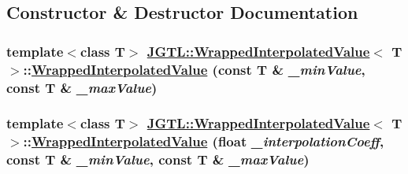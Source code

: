 \subsection{Constructor \& Destructor Documentation}
\hypertarget{class_j_g_t_l_1_1_wrapped_interpolated_value_ee757c96b36d3c8f65accff6005e5c11}{
\subsubsection[WrappedInterpolatedValue]{\setlength{\rightskip}{0pt plus 5cm}template$<$class T$>$ \hyperlink{class_j_g_t_l_1_1_wrapped_interpolated_value}{JGTL::Wrapped\-Interpolated\-Value}$<$ T $>$::\hyperlink{class_j_g_t_l_1_1_wrapped_interpolated_value}{Wrapped\-Interpolated\-Value} (const T \& {\em \_\-min\-Value}, const T \& {\em \_\-max\-Value})}}
\label{class_j_g_t_l_1_1_wrapped_interpolated_value_ee757c96b36d3c8f65accff6005e5c11}


\hypertarget{class_j_g_t_l_1_1_wrapped_interpolated_value_689683a55642976810f0f244f644f814}{
\subsubsection[WrappedInterpolatedValue]{\setlength{\rightskip}{0pt plus 5cm}template$<$class T$>$ \hyperlink{class_j_g_t_l_1_1_wrapped_interpolated_value}{JGTL::Wrapped\-Interpolated\-Value}$<$ T $>$::\hyperlink{class_j_g_t_l_1_1_wrapped_interpolated_value}{Wrapped\-Interpolated\-Value} (float {\em \_\-interpolation\-Coeff}, const T \& {\em \_\-min\-Value}, const T \& {\em \_\-max\-Value})}}
\label{class_j_g_t_l_1_1_wrapped_interpolated_value_689683a55642976810f0f244f644f814}


